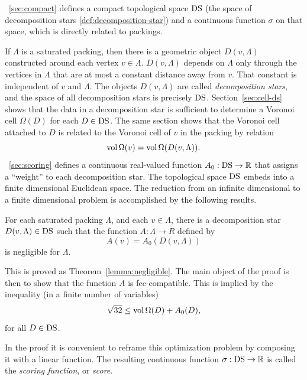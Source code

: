 \Chap~\ref{sec:compact} defines a compact topological space
${\operatorname{DS}}$ (the space of decomposition stars
\ref{def:decomposition-star}) and a continuous function $\sigma$
on that space, which is directly related to packings.

If $\Lambda$ is a saturated packing, then there is a geometric
object $D(v,\Lambda)$ constructed around each vertex
$v\in\Lambda$. $D(v,\Lambda)$ depends on $\Lambda$ only through
the vertices in $\Lambda$ that are at most a constant distance
away from $v$.  That constant is independent of $v$ and $\Lambda$.
The objects $D(v,\Lambda)$ are called {\it decomposition stars},
and the space of all decomposition stars is precisely ${\operatorname{DS}}$.
 Section~\ref{sec:cell-ds} shows that
the data in a decomposition star is sufficient to determine a
Voronoi cell
$\Omega(D)$ for each $D\in{\operatorname{DS}}$.
The same section shows that the Voronoi cell attached to $D$ is
related to the Voronoi cell of $v$ in the packing by relation
   $${\operatorname{vol}}\,\Omega(v) = {\operatorname{vol}}\,\Omega(D(v,\Lambda)).$$
\Chap~\ref{sec:scoring} defines a continuous real-valued function
$A_0:{\operatorname{DS}}\to\mathbb{R}$ that assigns a ``weight'' to each
decomposition star.  The topological space ${\operatorname{DS}}$ embeds into a
finite dimensional Euclidean space. The reduction from an infinite
dimensional to a finite dimensional problem is accomplished by the
following results.

\begin{theorem}\label{lemma:negligible'}
For each saturated packing $\Lambda$, and each $v\in\Lambda$,
there is a decomposition star $D(v,\Lambda)\in{\operatorname{DS}}$ such that
the function $A:\Lambda\to\ring{R}$ defined by
   $$A(v)= A_0(D(v,\Lambda))$$
is negligible for $\Lambda$.
\end{theorem}

This is proved as Theorem~\ref{lemma:negligible}.  The main object
of the proof is then to show that the function $A$ is
fcc-compatible. This is implied by the inequality (in a finite
number of variables)
      \begin{equation}
      \sqrt{32}\le{\operatorname{vol}}\,\Omega(D)+ A_0(D),
      \label{eqn:32}
      \end{equation}
for all $D\in{\operatorname{DS}}$.

In the proof it is convenient to reframe this optimization problem
by composing it with a linear function.  The resulting continuous
function $\sigma:{\operatorname{DS}}\to\mathbb{R}$ is called the
  {\it scoring function}, or {\it score}.

